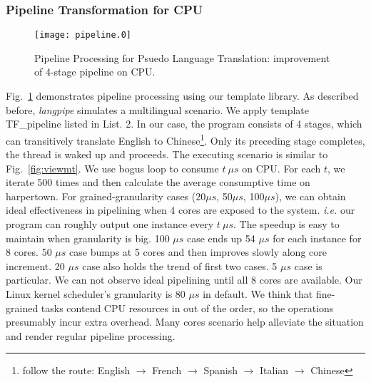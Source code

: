 \subsubsection{Pipeline Transformation for CPU}
\begin{figure}[htp]
\texttt{[image: pipeline.0]}
\caption{Pipeline Processing for Psuedo Language Translation:
  improvement of 4-stage pipeline on CPU.}\label{fig:pipe}
\end{figure}

Fig.~\ref{fig:pipe} demonstrates pipeline processing using our
template library. As described before, \textit{langpipe} simulates a
multilingual scenario. We apply template TF\_pipeline listed in
List. 2. In our case, the program consists of 4 stages,
which can transitively translate English to Chinese\footnote{follow the 
  route: English  $\to$ French $\to$ Spanish $\to$ Italian $\to$
  Chinese}. Only its preceding stage completes,  the thread is waked
up and proceeds. The executing scenario is similar to Fig.~\ref{fig:viewmt}. We use bogus loop to consume $t \  \mu s$ on CPU. For each $t$, we iterate 500
times and then calculate the average consumptive time on harpertown. For
grained-granularity cases (20$\mu s$, 50$\mu s$, 100$\mu s$), we can obtain ideal
effectiveness in pipelining when 4 cores are exposed to the system.
\textit{i.e.} our program can roughly output one instance every $t\  \mu
s$. The speedup is easy to maintain when granularity is big. 100 $\mu s$ case ends up 54 $\mu s$ for each instance for 8 cores. 50  $\mu s$ case
bumps at 5 cores and then improves slowly along core increment. 20
$\mu s$ case also holds the trend of first two cases. 5 $\mu s$ case is
particular. We can not observe ideal pipelining until all 8
cores are available.  Our Linux kernel scheduler's granularity is 80
$\mu s$ in default. We think that fine-grained tasks contend
CPU resources in out of the order, so the operations presumably
incur extra overhead. Many cores scenario help alleviate the
situation and render regular pipeline processing.

